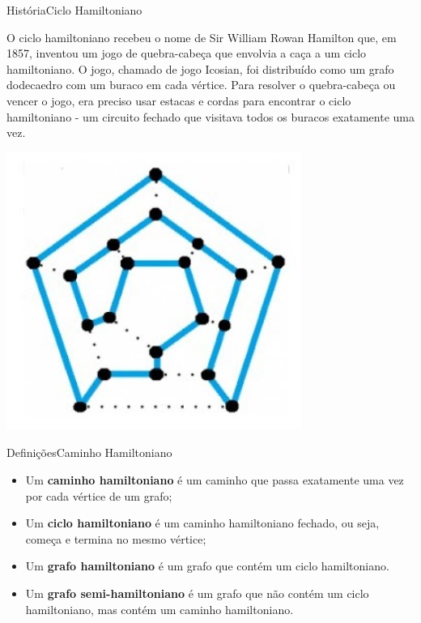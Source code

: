 \documentclass[t]{beamer}
\begin{document}
\begin{ftst}{História}{Ciclo Hamiltoniano}
\vone
\vone
\begin{minipage}{.5\textwidth}
\footnotesize
    O ciclo hamiltoniano recebeu o nome de Sir William Rowan Hamilton que, em 1857, inventou um jogo de quebra-cabeça que envolvia a caça a um ciclo hamiltoniano. 
    \vone
    O jogo, chamado de jogo Icosian, foi distribuído como um grafo dodecaedro com um buraco em cada vértice. Para resolver o quebra-cabeça ou vencer o jogo, era preciso usar estacas e cordas para encontrar o ciclo hamiltoniano - um circuito fechado que visitava todos os buracos exatamente uma vez.
\end{minipage}
\hfill
\begin{minipage}{.5\textwidth}
    \centering
    \includegraphics[scale=0.5]{Figuras/ciclo_hamiltoniano.jpg}
\end{minipage}

\end{ftst}


\begin{ftst}{Definições}{Caminho Hamiltoniano}
\vone
\vone
\begin{itemize}
    \item Um \textbf{caminho hamiltoniano} é um caminho que passa exatamente uma vez por cada vértice de um grafo;
    \item Um \textbf{ciclo hamiltoniano} é um caminho hamiltoniano fechado, ou seja, começa e termina no mesmo vértice;
    \item Um \textbf{grafo hamiltoniano} é um grafo que contém um ciclo hamiltoniano.
    \item Um \textbf{grafo semi-hamiltoniano} é um grafo que não contém um ciclo hamiltoniano, mas contém um caminho hamiltoniano.
\end{itemize}

\end{ftst}
\end{document}

